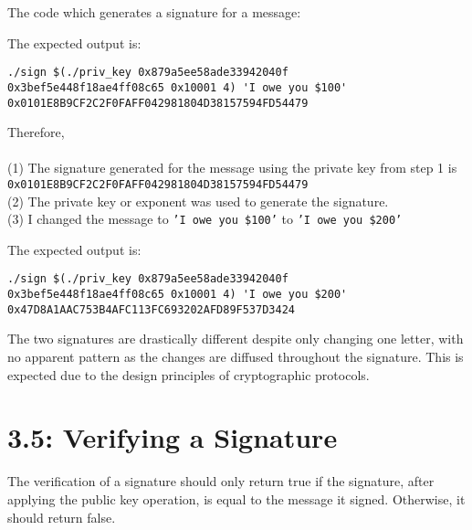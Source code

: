 \documentclass[a4paper,11pt]{article}
\theoremstyle{mytheor}
\begin{document}
\vspace{4mm}
\noindent The code which generates a signature for a message:
\vspace{4mm} %


\vspace{4mm}
\noindent The expected output is:

\begin{verbatim}
./sign $(./priv_key 0x879a5ee58ade33942040f 
0x3bef5e448f18ae4ff08c65 0x10001 4) 'I owe you $100'
0x0101E8B9CF2C2F0FAFF042981804D38157594FD54479
\end{verbatim}

\noindent Therefore, \\
\\ \noindent (1) The signature generated for the message using the private key from
step 1 is \\ \texttt{0x0101E8B9CF2C2F0FAFF042981804D38157594FD54479} \\

\noindent (2) The private key or exponent was used to generate the signature. \\

\noindent (3) I changed the message to \texttt{'I owe you \$100'} to \texttt{'I owe you \$200'}

\vspace{4mm}
\noindent The expected output is:

\begin{verbatim}
./sign $(./priv_key 0x879a5ee58ade33942040f 
0x3bef5e448f18ae4ff08c65 0x10001 4) 'I owe you $200'
0x47D8A1AAC753B4AFC113FC693202AFD89F537D3424
\end{verbatim}

\noindent The two signatures are drastically different despite only changing one letter, with no apparent pattern as the changes are diffused throughout the signature. This is expected due to the design principles of cryptographic protocols.

\vspace{-2mm}
\section*{\large 3.5: Verifying a Signature}

\noindent The verification of a signature should only return true if the signature, after applying the public key operation, is equal to the message it signed. Otherwise, it should return false.
\end{document}
